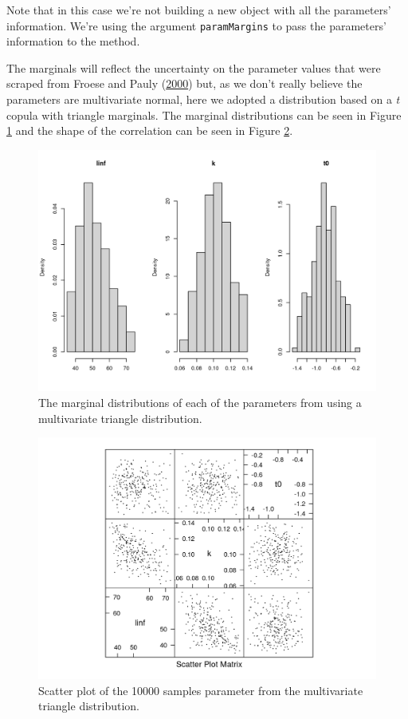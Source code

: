 \documentclass[
]{book}
\begin{document}
Note that in this case we're not building a new object with all the parameters' information. We're using the argument \texttt{paramMargins} to pass the parameters' information to the method.

The marginals will reflect the uncertainty on the parameter values that were scraped from Froese and Pauly (\protect\hyperlink{ref-fishbase}{2000}) but, as we don't really believe the parameters are multivariate normal, here we adopted a distribution based on a \emph{t} copula with triangle marginals. The marginal distributions can be seen in Figure \ref{fig:plottriparams} and the shape of the correlation can be seen in Figure \ref{fig:plottriscatter}.

\begin{figure}
\centering
\includegraphics{_bookdown_files/_main_files/figure-html/plottriparams-1.png}
\caption{\label{fig:plottriparams}The marginal distributions of each of the parameters from using a multivariate triangle distribution.}
\end{figure}

\begin{figure}
\centering
\includegraphics{_bookdown_files/_main_files/figure-html/plottriscatter-1.png}
\caption{\label{fig:plottriscatter}Scatter plot of the 10000 samples parameter from the multivariate triangle distribution.}
\end{figure}
\end{document}
